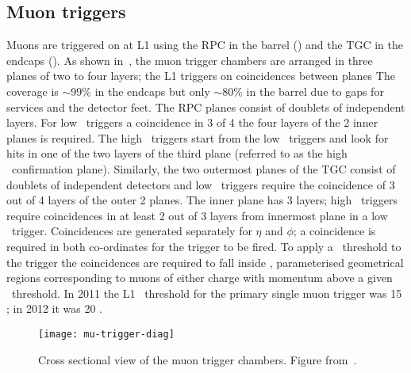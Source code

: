 \subsection{Muon triggers}
\label{sec:reco-mu-triggers}

Muons are triggered on at L1 using the RPC in the barrel () and
the TGC in the endcaps (). As shown in~, the
muon trigger chambers are arranged in three planes of two to four layers; the L1
triggers on coincidences between planes
The coverage is $\sim$99\% in the endcaps but only $\sim$80\% in the barrel due to
gaps for services and the detector feet.
The RPC planes consist of
doublets of independent layers. For low \pt\ triggers a coincidence in 3 of 4
the four layers of the 2 inner planes is required. The high \pt\ triggers start
from the low \pt\ triggers and look for hits in one of the two layers of the
third plane (referred to as the high \pt\ confirmation plane). Similarly, the two outermost
planes of the TGC consist of doublets of independent detectors and low \pt\
triggers require the coincidence of 3 out of 4 layers of the outer 2 planes. The
inner plane has 3 layers; high \pt\ triggers require coincidences in at least 2
out of 3 layers from innermost plane in a low \pt\ trigger. Coincidences are generated separately for
$\eta$ and $\phi$; a coincidence is required in both co-ordinates for the
trigger to be fired. To apply a \pt\ threshold to the trigger the coincidences
are required to fall inside \intro{roads}, parameterised geometrical regions
corresponding to muons of either charge with momentum above a given \pt\
threshold. In 2011 the L1 \pt\ threshold for the primary single muon trigger was
15 \GeV; in 2012 it was 20 \GeV.

\begin{figure}[h]
\centering
            \texttt{[image: mu-trigger-diag]}
\caption{
Cross sectional view of the muon trigger chambers. Figure from~\cite{Aad:2012xs}.}
\label{fig:mu-trigger-diag}
\end{figure}


